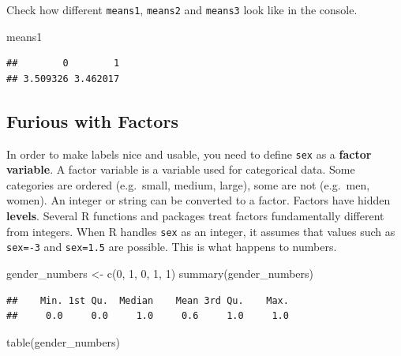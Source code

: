 \documentclass[
]{book}
\newenvironment{Shaded}{\begin{snugshade}}{\end{snugshade}}
\newcommand{\DecValTok}[1]{\textcolor[rgb]{0.00,0.00,0.81}{#1}}
\newcommand{\FunctionTok}[1]{\textcolor[rgb]{0.00,0.00,0.00}{#1}}
\newcommand{\NormalTok}[1]{#1}
\newcommand{\OtherTok}[1]{\textcolor[rgb]{0.56,0.35,0.01}{#1}}
\begin{document}
Check how different \texttt{means1}, \texttt{means2} and \texttt{means3} look like in the console.

\begin{Shaded}
\begin{Highlighting}[]
\NormalTok{means1}
\end{Highlighting}
\end{Shaded}

\begin{verbatim}
##        0        1 
## 3.509326 3.462017
\end{verbatim}

\hypertarget{furious-with-factors}{%
\subsection{Furious with Factors}\label{furious-with-factors}}

In order to make labels nice and usable, you need to define \texttt{sex} as a \textbf{factor variable}. A factor variable is a variable used for categorical data. Some categories are ordered (e.g.~small, medium, large), some are not (e.g.~men, women). An integer or string can be converted to a factor. Factors have hidden \textbf{levels}. Several R functions and packages treat factors fundamentally different from integers. When R handles \texttt{sex} as an integer, it assumes that values such as \texttt{sex=-3} and \texttt{sex=1.5} are possible. This is what happens to numbers.

\begin{Shaded}
\begin{Highlighting}[]
\NormalTok{gender\_numbers }\OtherTok{\textless{}{-}} \FunctionTok{c}\NormalTok{(}\DecValTok{0}\NormalTok{, }\DecValTok{1}\NormalTok{, }\DecValTok{0}\NormalTok{, }\DecValTok{1}\NormalTok{, }\DecValTok{1}\NormalTok{)}
\FunctionTok{summary}\NormalTok{(gender\_numbers)}
\end{Highlighting}
\end{Shaded}

\begin{verbatim}
##    Min. 1st Qu.  Median    Mean 3rd Qu.    Max. 
##     0.0     0.0     1.0     0.6     1.0     1.0
\end{verbatim}

\begin{Shaded}
\begin{Highlighting}[]
\FunctionTok{table}\NormalTok{(gender\_numbers)}
\end{Highlighting}
\end{Shaded}
\end{document}
